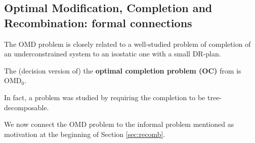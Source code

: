 %
\subsection{Optimal Modification, Completion and Recombination: formal
connections}
%
The OMD problem is closely related to a well-studied problem of completion of an underconstrained system to an isostatic one with a small DR-plan.
\begin{observation}\label{obs:OC_to_OMD}
    The (decision version of) the \textbf{optimal completion problem (OC)} from \cite{sitharam2005combinatorial,joan-arinyo2003transforming,zhang-gao2006well} is OMD$_0$.
\end{observation}
In fact, a  problem was studied by \cite{joan-arinyo2003transforming} requiring the completion to be tree-decomposable.

We now connect the OMD problem to the informal  problem mentioned as motivation at the beginning of Section \ref{sec:recomb}.


